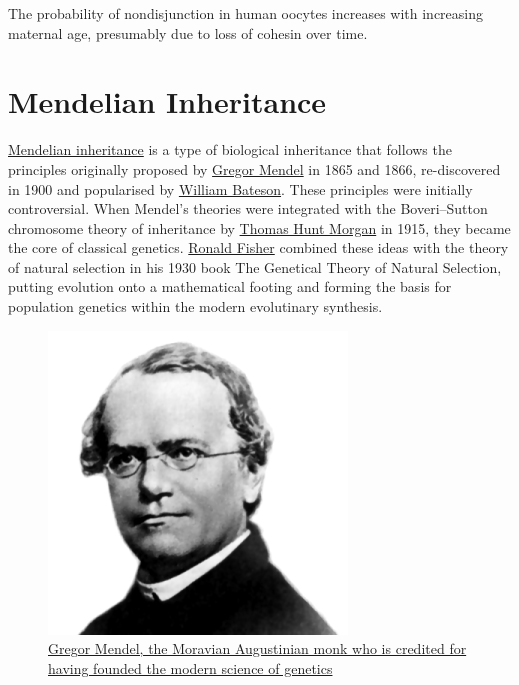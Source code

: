 The probability of nondisjunction in human oocytes increases with increasing maternal age, presumably due to loss of cohesin over time.

\hypertarget{mendelian-inheritance}{%
\chapter{Mendelian Inheritance}\label{mendelian-inheritance}}

\href{https://en.wikipedia.org/wiki/Mendelian_inheritance}{Mendelian inheritance} is a type of biological inheritance that follows the principles originally proposed by \href{https://en.wikipedia.org/wiki/Gregor_Mendel}{Gregor Mendel} in 1865 and 1866, re-discovered in 1900 and popularised by \href{https://en.wikipedia.org/wiki/William_Bateson}{William Bateson}. These principles were initially controversial. When Mendel's theories were integrated with the Boveri--Sutton chromosome theory of inheritance by \href{https://en.wikipedia.org/wiki/Thomas_Hunt_Morgan}{Thomas Hunt Morgan} in 1915, they became the core of classical genetics. \href{https://en.wikipedia.org/wiki/Ronald_Fisher}{Ronald Fisher} combined these ideas with the theory of natural selection in his 1930 book The Genetical Theory of Natural Selection, putting evolution onto a mathematical footing and forming the basis for population genetics within the modern evolutinary synthesis.



\begin{figure}

{\centering \includegraphics[width=0.7\linewidth]{./figures/mendel/Gregor_Mendel} 

}

\caption{\href{https://commons.wikimedia.org/wiki/File:Gregor_Mendel.png}{Gregor Mendel, the Moravian Augustinian monk who is credited for having founded the modern science of genetics}}\label{fig:portrait}
\end{figure}

